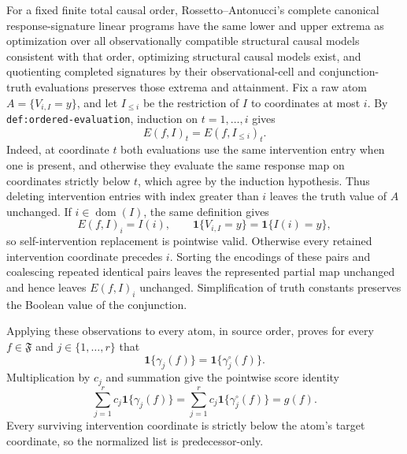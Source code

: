 For a fixed finite total causal order, Rossetto--Antonucci's complete canonical response-signature linear programs have the same lower and upper extrema as optimization over all observationally compatible structural causal models consistent with that order, optimizing structural causal models exist, and quotienting completed signatures by their observational-cell and conjunction-truth evaluations preserves those extrema and attainment.
Fix a raw atom \(A=\{V_{i,I}=y\}\), and let \(I_{\leq i}\) be the restriction of \(I\) to coordinates at most \(i\). By \texttt{def:ordered-evaluation}, induction on \(t=1,\ldots,i\) gives
\[
 E(f,I)_t=E(f,I_{\leq i})_t.
\]
Indeed, at coordinate \(t\) both evaluations use the same intervention entry when one is present, and otherwise they evaluate the same response map on coordinates strictly below \(t\), which agree by the induction hypothesis. Thus deleting intervention entries with index greater than \(i\) leaves the truth value of \(A\) unchanged. If \(i\in\operatorname{dom}(I)\), the same definition gives
\[
 E(f,I)_i=I(i),
 \qquad
 \mathbf 1\{V_{i,I}=y\}=\mathbf 1\{I(i)=y\},
\]
so self-intervention replacement is pointwise valid. Otherwise every retained intervention coordinate precedes \(i\). Sorting the encodings of these pairs and coalescing repeated identical pairs leaves the represented partial map unchanged and hence leaves \(E(f,I)_i\) unchanged. Simplification of truth constants preserves the Boolean value of the conjunction.

Applying these observations to every atom, in source order, proves for every \(f\in\mathfrak F\) and \(j\in\{1,\ldots,r\}\) that
\[
 \mathbf 1\{\gamma_j(f)\}
 =\mathbf 1\{\gamma_j^{\circ}(f)\}.
\]
Multiplication by \(c_j\) and summation give the pointwise score identity
\[
 \sum_{j=1}^r c_j\mathbf 1\{\gamma_j(f)\}
 =\sum_{j=1}^r c_j\mathbf 1\{\gamma_j^{\circ}(f)\}
 =g(f).
\]
Every surviving intervention coordinate is strictly below the atom's target coordinate, so the normalized list is predecessor-only.


